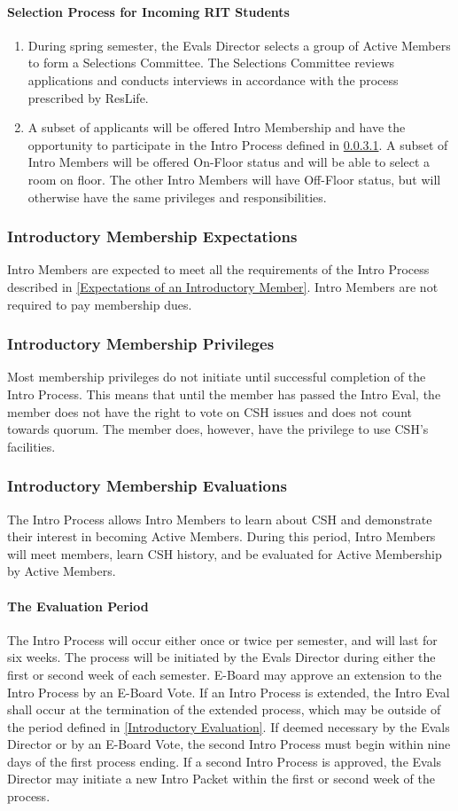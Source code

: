 \documentclass{article}
\newcommand{\asubsection}[1]{\subsubsection{#1} \label{#1}}
\newcommand{\asubsubsection}[1]{\paragraph{#1} \label{#1}}
\begin{document}
\asubsubsection{Selection Process for Incoming RIT Students}
\begin{enumerate}
	\item During spring semester, the Evals Director selects a group of Active Members to form a Selections Committee.
	      The Selections Committee reviews applications and conducts interviews in accordance with the process prescribed by ResLife.
	\item A subset of applicants will be offered Intro Membership and have the opportunity to participate in the Intro Process defined in \ref{The Evaluation Period}.
	      A subset of Intro Members will be offered On-Floor status and will be able to select a room on floor.
	      The other Intro Members will have Off-Floor status, but will otherwise have the same privileges and responsibilities.
\end{enumerate}

\asubsection{Introductory Membership Expectations}
Intro Members are expected to meet all the requirements of the Intro Process described in \ref{Expectations of an Introductory Member}.
Intro Members are not required to pay membership dues.

\asubsection{Introductory Membership Privileges}
Most membership privileges do not initiate until successful completion of the Intro Process.
This means that until the member has passed the Intro Eval, the member does not have the right to vote on CSH issues and does not count towards quorum.
The member does, however, have the privilege to use CSH's facilities.

\asubsection{Introductory Membership Evaluations}
The Intro Process allows Intro Members to learn about CSH and demonstrate their interest in becoming Active Members. During this period, Intro Members will meet members, learn CSH history, and be evaluated for Active Membership by Active Members.

\asubsubsection{The Evaluation Period}
The Intro Process will occur either once or twice per semester, and will last for six weeks.
The process will be initiated by the Evals Director during either the first or second week of each semester. E-Board may approve an extension to the Intro Process by an E-Board Vote.
If an Intro Process is extended, the Intro Eval shall occur at the termination of the extended process, which may be outside of the period defined in \ref{Introductory Evaluation}.
If deemed necessary by the Evals Director or by an E-Board Vote, the second Intro Process must begin within nine days of the first process ending.
If a second Intro Process is approved, the Evals Director may initiate a new Intro Packet within the first or second week of the process.
\end{document}
